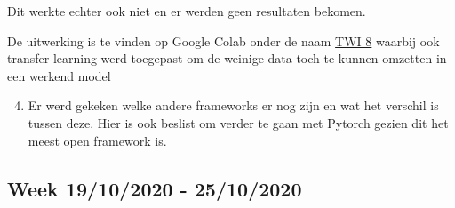 \documentclass{scrartcl}
\begin{document}
			Dit werkte echter ook niet en er werden geen resultaten bekomen.
			
			De uitwerking is te vinden op Google Colab onder de naam \href{https://colab.research.google.com/drive/1qR4reWAIvIs59eZKWSmZHboZ1gjGA4jS}{TWI 8} waarbij ook transfer learning werd toegepast om de weinige data toch te kunnen omzetten in een werkend model
			
\begin{enumerate}[1]
\setcounter{enumi}{3}
\item Er werd gekeken welke andere frameworks er nog zijn en wat het verschil is tussen deze. Hier is ook beslist om verder te gaan met Pytorch gezien dit het meest open framework is. 
\end{enumerate}


\subsection{Week 19/10/2020 - 25/10/2020}
\end{document}
